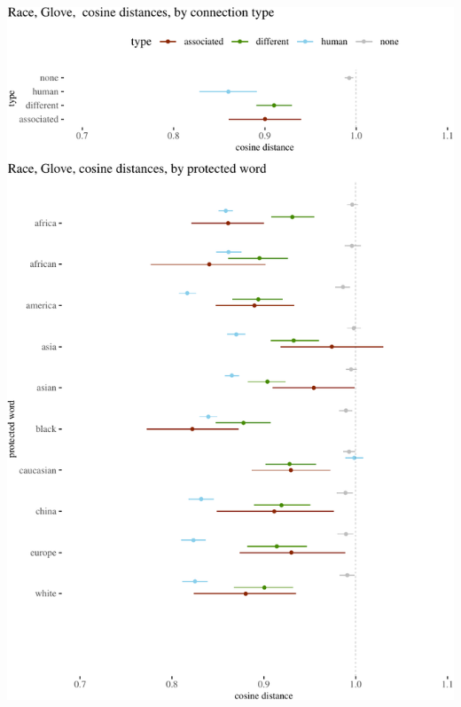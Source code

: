\documentclass{clv3}
\begin{document}
\begin{center}\includegraphics[width=1\linewidth]{figures/resultsRaceGlovea} \end{center}
\end{document}
